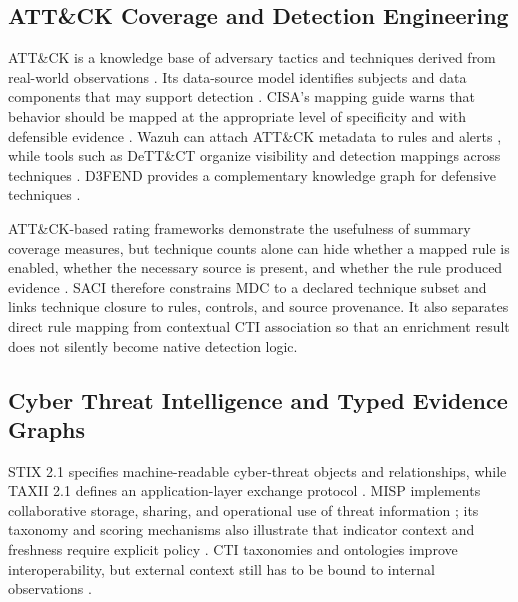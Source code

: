 \documentclass[a4paper,conference]{IEEEtran}
\begin{document}
\subsection{ATT\&CK Coverage and Detection Engineering}
ATT\&CK is a knowledge base of adversary tactics and techniques derived from real-world observations \cite{mitre_matrix,mitre_philosophy}. Its data-source model identifies subjects and data components that may support detection \cite{mitre_datasources}. CISA's mapping guide warns that behavior should be mapped at the appropriate level of specificity and with defensible evidence \cite{cisa_mapping}. Wazuh can attach ATT\&CK metadata to rules and alerts \cite{wazuh_mitre}, while tools such as DeTT\&CT organize visibility and detection mappings across techniques \cite{dettect}. D3FEND provides a complementary knowledge graph for defensive techniques \cite{d3fend}.

ATT\&CK-based rating frameworks demonstrate the usefulness of summary coverage measures, but technique counts alone can hide whether a mapped rule is enabled, whether the necessary source is present, and whether the rule produced evidence \cite{manocha2021,alsada2023}. SACI therefore constrains MDC to a declared technique subset and links technique closure to rules, controls, and source provenance. It also separates direct rule mapping from contextual CTI association so that an enrichment result does not silently become native detection logic.

\subsection{Cyber Threat Intelligence and Typed Evidence Graphs}
STIX 2.1 specifies machine-readable cyber-threat objects and relationships, while TAXII 2.1 defines an application-layer exchange protocol \cite{oasis_stix,oasis_taxii}. MISP implements collaborative storage, sharing, and operational use of threat information \cite{wagner2016,misp_docs}; its taxonomy and scoring mechanisms also illustrate that indicator context and freshness require explicit policy \cite{mokaddem2019}. CTI taxonomies and ontologies improve interoperability, but external context still has to be bound to internal observations \cite{mavroeidis2017}.
\end{document}
